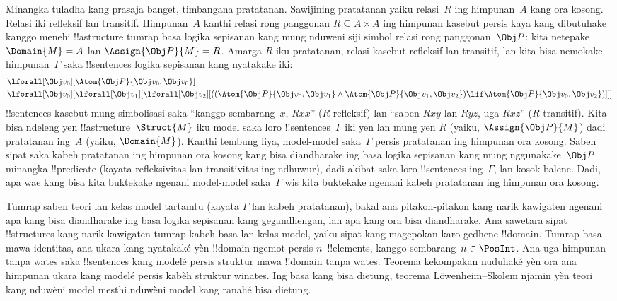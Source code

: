 \documentclass[../../../include/open-logic-section]{subfiles}
\begin{document}
Minangka tuladha kang prasaja banget, timbangana pratatanan. Sawijining
pratatanan yaiku relasi~$R$ ing himpunan~$A$ kang ora kosong. Relasi iki
refleksif lan transitif. Himpunan~$A$ kanthi relasi rong panggonan $R \subseteq A
\times A$ ing himpunan kasebut persis kaya kang dibutuhake kanggo
menehi !!a{structure} tumrap basa logika sepisanan kang mung nduweni
siji simbol relasi rong panggonan~$\Obj P$: kita netepake
$\Domain{M} = A$ lan $\Assign{\Obj P}{M} = R$. Amarga $R$ iku
pratatanan, relasi kasebut refleksif lan transitif, lan kita bisa
nemokake himpunan~$\Gamma$ saka !!{sentence}s logika sepisanan kang
nyatakake iki:
\begin{align*}
  & \lforall[\Obj v_0][\Atom{\Obj P}{\Obj v_0,\Obj v_0}]\\
  & \lforall[\Obj v_0][\lforall[\Obj v_1][\lforall[\Obj v_2][((\Atom{\Obj P}{\Obj v_0,\Obj v_1} \land \Atom{\Obj P}{\Obj v_1,\Obj v_2}) \lif \Atom{\Obj P}{\Obj v_0,\Obj v_2})]]]
\end{align*}
!!{sentence}s kasebut mung simbolisasi saka ``kanggo sembarang~$x$,
$Rxx$'' ($R$ refleksif) lan ``saben $Rxy$ lan $Ryz$, uga $Rxz$''
($R$ transitif). Kita bisa ndeleng yen !!a{structure}~$\Struct{M}$ iku
model saka loro !!{sentence}s~$\Gamma$ iki yen lan mung yen $R$
(yaiku, $\Assign{\Obj P}{M}$) dadi pratatanan ing~$A$ (yaiku,
$\Domain{M}$). Kanthi tembung liya, model-model saka~$\Gamma$ persis
pratatanan ing himpunan ora kosong. Saben sipat saka kabeh pratatanan ing himpunan ora kosong kang bisa diandharake ing
basa logika sepisanan kang mung nggunakake~$\Obj P$ minangka
!!{predicate} (kayata refleksivitas lan transitivitas ing ndhuwur),
dadi akibat saka loro !!{sentence}s ing~$\Gamma$, lan kosok balene.
Dadi, apa wae kang bisa kita buktekake ngenani model-model saka~$\Gamma$
wis kita buktekake ngenani kabeh pratatanan ing himpunan ora kosong.

Tumrap saben teori lan kelas model tartamtu (kayata $\Gamma$ lan kabeh
pratatanan), bakal ana pitakon-pitakon kang narik kawigaten ngenani apa
kang bisa diandharake ing basa logika sepisanan kang gegandhengan, lan
apa kang ora bisa diandharake. Ana sawetara sipat !!{structure}s kang
narik kawigaten tumrap kabeh basa lan kelas model, yaiku sipat kang
magepokan karo gedhene !!{domain}. Tumrap basa mawa identitas, ana ukara kang
nyatakaké yèn !!{domain} ngemot persis $n$~!!{element}s, kanggo
sembarang~$n \in \PosInt$. Ana uga himpunan tanpa wates saka
!!{sentence}s kang modelé persis struktur mawa !!{domain} tanpa wates.
Teorema kekompakan nuduhaké yèn ora ana himpunan ukara kang
modelé persis kabèh struktur winates. Ing basa kang bisa dietung,
teorema L\"owenheim--Skolem njamin yèn teori kang nduwèni model
mesthi nduwèni model kang ranahé bisa dietung.
\end{document}
